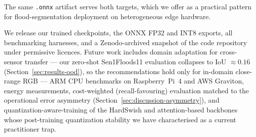 The same \texttt{.onnx} artifact serves both targets, which we offer as a practical pattern for flood-segmentation deployment on heterogeneous edge hardware.

We release our trained checkpoints, the ONNX FP32 and INT8 exports, all benchmarking harnesses, and a Zenodo-archived snapshot of the code repository under permissive licences. Future work includes domain adaptation for cross-sensor transfer --- our zero-shot Sen1Floods11 evaluation collapses to IoU $\approx 0.16$ (Section~\ref{sec:results-ood}), so the recommendations hold only for in-domain close-range RGB --- ARM CPU benchmarks on Raspberry~Pi~4 and AWS Graviton, energy measurements, cost-weighted (recall-favouring) evaluation matched to the operational error asymmetry (Section~\ref{sec:discussion-asymmetry}), and quantization-aware-training of the HardSwish and attention-based backbones whose post-training quantization stability we have characterised as a current practitioner trap.
